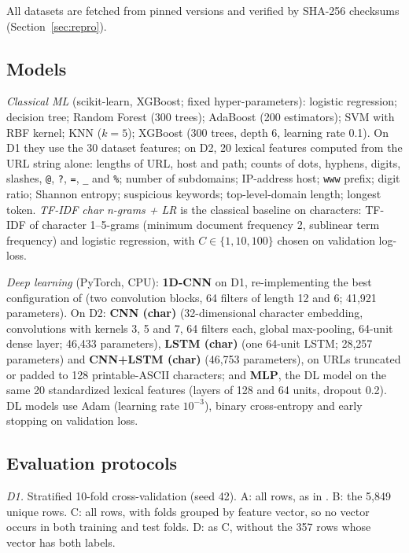 \documentclass[conference]{IEEEtran}
\begin{document}
All datasets are fetched from pinned versions and verified by SHA-256 checksums (Section~\ref{sec:repro}).

\subsection{Models}

\emph{Classical ML} (scikit-learn, XGBoost; fixed hyper-parameters): logistic regression; decision tree; Random Forest (300 trees); AdaBoost (200 estimators); SVM with RBF kernel; KNN ($k{=}5$); XGBoost (300 trees, depth 6, learning rate 0.1). On D1 they use the 30 dataset features; on D2, 20 lexical features computed from the URL string alone: lengths of URL, host and path; counts of dots, hyphens, digits, slashes, \texttt{@}, \texttt{?}, \texttt{=}, \texttt{\_} and \texttt{\%}; number of subdomains; IP-address host; \texttt{www} prefix; digit ratio; Shannon entropy; suspicious keywords; top-level-domain length; longest token. \emph{TF-IDF char n-grams + LR} is the classical baseline on characters: TF-IDF of character 1--5-grams (minimum document frequency 2, sublinear term frequency) and logistic regression, with $C\in\{1,10,100\}$ chosen on validation log-loss.

\emph{Deep learning} (PyTorch, CPU): \textbf{1D-CNN} on D1, re-implementing the best configuration of \cite{yerima2020} (two convolution blocks, 64 filters of length 12 and 6; 41,921 parameters). On D2: \textbf{CNN (char)} (32-dimensional character embedding, convolutions with kernels 3, 5 and 7, 64 filters each, global max-pooling, 64-unit dense layer; 46,433 parameters), \textbf{LSTM (char)} (one 64-unit LSTM; 28,257 parameters) and \textbf{CNN+LSTM (char)} (46,753 parameters), on URLs truncated or padded to 128 printable-ASCII characters; and \textbf{MLP}, the DL model on the same 20 standardized lexical features (layers of 128 and 64 units, dropout 0.2). DL models use Adam (learning rate $10^{-3}$), binary cross-entropy and early stopping on validation loss.

\subsection{Evaluation protocols}

\emph{D1.} Stratified 10-fold cross-validation (seed 42). A: all rows, as in \cite{shahrivari2020}. B: the 5,849 unique rows. C: all rows, with folds grouped by feature vector, so no vector occurs in both training and test folds. D: as C, without the 357 rows whose vector has both labels.
\end{document}
